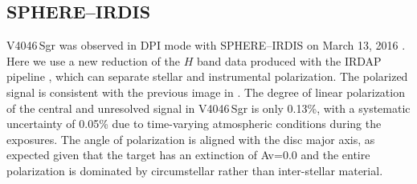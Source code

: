 \documentclass[fleqn,usenatbib,useAMS]{mnras}
\begin{document}
\subsection{SPHERE--IRDIS}

V4046\,Sgr was observed in DPI mode with SPHERE--IRDIS on March 13, 2016 \citep[see][for details]{Avenhaus_2018}. Here we use a new reduction of the $H$ band data produced with the IRDAP pipeline \citep{2020A&A...633A..64V}, which can separate stellar and instrumental polarization. The polarized signal is consistent with the previous image in \citet{Avenhaus_2018}. The degree of linear polarization of the central and unresolved signal in V4046\,Sgr is only 0.13\%, with a systematic uncertainty of 0.05\% due to time-varying atmospheric conditions during the exposures. The angle of polarization is aligned with the disc major axis, as expected given that the target has an extinction of Av=0.0 \citep{2016ApJ...828...69M} and the entire polarization is dominated by circumstellar rather than inter-stellar material. 
\end{document}
